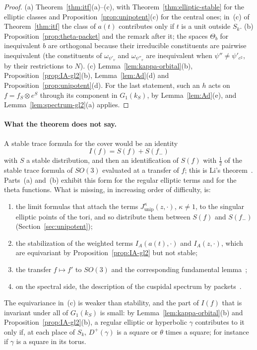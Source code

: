 \begin{proof}
(a) Theorem~\ref{thm:itf}(a)--(c), with Theorem~\ref{thm:elliptic-stable}
for the elliptic classes and Proposition~\ref{prop:unipotent}(c) for the
central ones; in~(c) of Theorem~\ref{thm:itf} the class of $a(t)$
contributes only if $t$ is a unit outside $S_k$. (b)
Proposition~\ref{prop:theta-packet} and the remark after it; the spaces
$\Theta_b$ for inequivalent $b$ are orthogonal because their irreducible
constituents are pairwise inequivalent (the constituents of
$\omega_{\psi'_v}$ and $\omega_{\psi''_v}$ are inequivalent when
$\psi''\ne\psi'_{c^2}$, by their restrictions to $N$). (c)
Lemma~\ref{lem:kappa-orbital}(b), Proposition~\ref{prop:IA-gl2}(b),
Lemma~\ref{lem:Ad}(d) and Proposition~\ref{prop:unipotent}(d). For the
last statement, such an $h$ acts on $f=f_S\otimes e^S$ through its
component in $G_1(k_S)$, by Lemma~\ref{lem:Ad}(e), and
Lemma~\ref{lem:spectrum-gl2}(a) applies.
\end{proof}

\paragraph{What the theorem does not say.} A stable trace formula for the
cover would be an identity
\[
I(f)=S(f)+S(f_-)
\]
with $S$ a stable distribution, and then an identification of $S(f)$
with $\frac12$ of the stable trace formula of $SO(3)$ evaluated at a
transfer of $f$; this is Li's theorem~\cite{Li21}. Parts~(a) and~(b)
exhibit this form for the regular elliptic terms and for the theta
functions. What is missing, in increasing order of difficulty, is:
\begin{enumerate}[label=(\roman*)]
\item the limit formulas that attach the terms $J^\kappa_{\mathrm{unip}}
  (z,\cdot)$, $\kappa\ne1$, to the singular elliptic points of the tori,
  and so distribute them between $S(f)$ and $S(f_-)$
  (Section~\ref{sec:unipotent});
\item the stabilization of the weighted terms $I_A(a(t),\cdot)$ and
  $I_A(z,\cdot)$, which are equivariant by
  Proposition~\ref{prop:IA-gl2} but not stable;
\item the transfer $f\mapsto f'$ to $SO(3)$ and the corresponding
  fundamental lemma~\cite{Li11,Li12b};
\item on the spectral side, the description of the cuspidal spectrum by
  packets~\cite{Wa80,Wa91,GI18}.
\end{enumerate}
The equivariance in~(c) is weaker than stability, and the part of $I(f)$
that is invariant under all of $G_1(k_S)$ is small: by Lemma~\ref{lem:kappa-orbital}(b) and
Proposition~\ref{prop:IA-gl2}(b), a regular elliptic or hyperbolic
$\gamma$ contributes to it only if, at each place of $S_k$, $D^+(\gamma)$
is a square or $\theta$ times a square; for instance if $\gamma$ is a
square in its torus.

